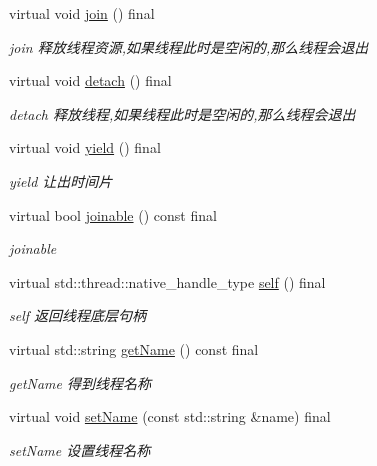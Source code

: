 \begin{DoxyCompactItemize}
virtual void \hyperlink{classThread_a07b23d8d75300651cba3eb79652c77fd}{join} () final
\begin{DoxyCompactList}\small\item\em join 释放线程资源,如果线程此时是空闲的,那么线程会退出 \end{DoxyCompactList}\item 
\mbox{\label{classThread_affb34b8590eab79785627ae48cbd297d}} 
virtual void \hyperlink{classThread_affb34b8590eab79785627ae48cbd297d}{detach} () final
\begin{DoxyCompactList}\small\item\em detach 释放线程,如果线程此时是空闲的,那么线程会退出 \end{DoxyCompactList}\item 
\mbox{\label{classThread_ac09e8b8ff4fb0a97315b5a501e722783}} 
virtual void \hyperlink{classThread_ac09e8b8ff4fb0a97315b5a501e722783}{yield} () final
\begin{DoxyCompactList}\small\item\em yield 让出时间片 \end{DoxyCompactList}\item 
virtual bool \hyperlink{classThread_a86d1c278c0b9fea63037c437a909064f}{joinable} () const final
\begin{DoxyCompactList}\small\item\em joinable \end{DoxyCompactList}\item 
virtual std\+::thread\+::native\+\_\+handle\+\_\+type \hyperlink{classThread_a554185abbfacbcc4bf2e953cdddcbbba}{self} () final
\begin{DoxyCompactList}\small\item\em self 返回线程底层句柄 \end{DoxyCompactList}\item 
virtual std\+::string \hyperlink{classThread_a19bc237f8a86727a5a4b516122fe20f6}{get\+Name} () const final
\begin{DoxyCompactList}\small\item\em get\+Name 得到线程名称 \end{DoxyCompactList}\item 
virtual void \hyperlink{classThread_ae816904b2a3e248472813e17c2b12a71}{set\+Name} (const std\+::string \&name) final
\begin{DoxyCompactList}\small\item\em set\+Name 设置线程名称 \end{DoxyCompactList}\item 

\end{DoxyCompactItemize}

